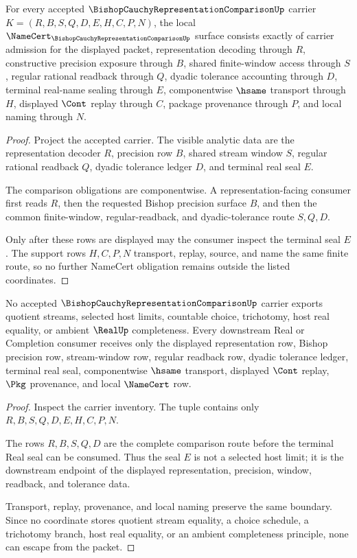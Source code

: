 \begin{theorem}
\label{thm:bishop-cauchy-representation-comparison-namecert-obligations}
For every accepted $\BishopCauchyRepresentationComparisonUp$ carrier $K=(R,B,S,Q,D,E,H,C,P,N)$, the local $\NameCert_{\BishopCauchyRepresentationComparisonUp}$ surface consists exactly of carrier admission for the displayed packet, representation decoding through $R$, constructive precision exposure through $B$, shared finite-window access through $S$, regular rational readback through $Q$, dyadic tolerance accounting through $D$, terminal real-name sealing through $E$, componentwise $\hsame$ transport through $H$, displayed $\Cont$ replay through $C$, package provenance through $P$, and local naming through $N$.
\end{theorem}
\begin{proof}
Project the accepted carrier. The visible analytic data are the representation decoder $R$, precision row $B$, shared stream window $S$, regular rational readback $Q$, dyadic tolerance ledger $D$, and terminal real seal $E$.

The comparison obligations are componentwise. A representation-facing consumer first reads $R$, then the requested Bishop precision surface $B$, and then the common finite-window, regular-readback, and dyadic-tolerance route $S,Q,D$.

Only after these rows are displayed may the consumer inspect the terminal seal $E$. The support rows $H,C,P,N$ transport, replay, source, and name the same finite route, so no further NameCert obligation remains outside the listed coordinates.
\end{proof}

\begin{theorem}
\label{thm:bishop-cauchy-representation-comparison-nonescape}
No accepted $\BishopCauchyRepresentationComparisonUp$ carrier exports quotient streams, selected host limits, countable choice, trichotomy, host real equality, or ambient $\RealUp$ completeness. Every downstream Real or Completion consumer receives only the displayed representation row, Bishop precision row, stream-window row, regular readback row, dyadic tolerance ledger, terminal real seal, componentwise $\hsame$ transport, displayed $\Cont$ replay, $\Pkg$ provenance, and local $\NameCert$ row.
\end{theorem}
\begin{proof}
Inspect the carrier inventory. The tuple contains only $R,B,S,Q,D,E,H,C,P,N$.

The rows $R,B,S,Q,D$ are the complete comparison route before the terminal Real seal can be consumed. Thus the seal $E$ is not a selected host limit; it is the downstream endpoint of the displayed representation, precision, window, readback, and tolerance data.

Transport, replay, provenance, and local naming preserve the same boundary. Since no coordinate stores quotient stream equality, a choice schedule, a trichotomy branch, host real equality, or an ambient completeness principle, none can escape from the packet.
\end{proof}


